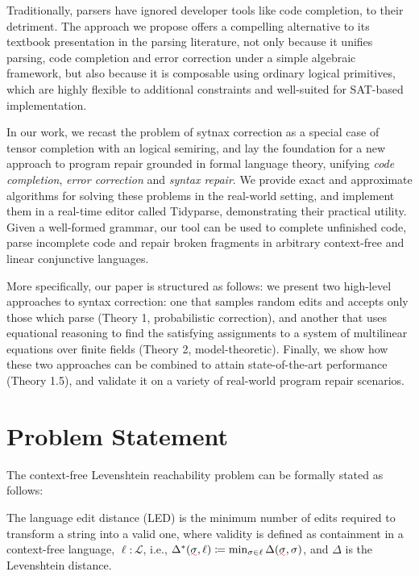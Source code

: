 \documentclass[sigplan,review,anonymous,acmsmall]{acmart}\settopmatter{printfolios=false,printccs=false,printacmref=false}
\begin{document}
Traditionally, parsers have ignored developer tools like code completion, to their detriment. The approach we propose offers a compelling alternative to its textbook presentation in the parsing literature, not only because it unifies parsing, code completion and error correction under a simple algebraic framework, but also because it is composable using ordinary logical primitives, which are highly flexible to additional constraints and well-suited for SAT-based implementation.

In our work, we recast the problem of sytnax correction as a special case of tensor completion with an logical semiring, and lay the foundation for a new approach to program repair grounded in formal language theory, unifying \textit{code completion}, \textit{error correction} and \textit{syntax repair}. We provide exact and approximate algorithms for solving these problems in the real-world setting, and implement them in a real-time editor called Tidyparse, demonstrating their practical utility. Given a well-formed grammar, our tool can be used to complete unfinished code, parse incomplete code and repair broken fragments in arbitrary context-free and linear conjunctive languages.

More specifically, our paper is structured as follows: we present two high-level approaches to syntax correction: one that samples random edits and accepts only those which parse (Theory 1, probabilistic correction), and another that uses equational reasoning to find the satisfying assignments to a system of multilinear equations over finite fields (Theory 2, model-theoretic). Finally, we show how these two approaches can be combined to attain state-of-the-art performance (Theory 1.5), and validate it on a variety of real-world program repair scenarios.

\section{Problem Statement}

The context-free Levenshtein reachability problem can be formally stated as follows:

\begin{definition}
The language edit distance (LED) is the minimum number of edits required to transform a string into a valid one, where validity is defined as containment in a context-free language, $\ell: \mathcal{L}$, i.e., $\Delta^*(\err{\sigma}, \ell) \coloneqq \min_{\sigma \in \ell}\Delta(\err{\sigma}, \sigma)$, and $\Delta$ is the Levenshtein distance.
\end{definition}
\end{document}
